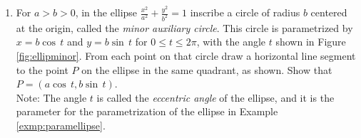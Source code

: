 \divider
\vspace{2mm}
\startexercises\label{sec7dot6}
{\small
{}
\begin{enumerate}[\bfseries 1.]
 \item\label{exer:ellipminor} For $a>b>0$, in the ellipse
  $\frac{x^2}{a^2}+\frac{y^2}{b^2}=1$ inscribe a circle of radius $b$ centered
  at the origin, called the \emph{minor auxiliary circle}. This circle is
  parametrized by $x=b \cos\,t$ and $y=b \sin\,t$ for $0 \le t \le 2\pi$, with
  the angle $t$ shown in Figure \ref{fig:ellipminor}. From each point on that
  circle draw a horizontal line segment to the point $P$ on the ellipse in the
  same quadrant, as shown. Show that $P=(a \cos\,t,b \sin\,t)$.\\Note: The
  angle $t$ is called the \emph{eccentric angle} of the ellipse, and it is the
  parameter for the parametrization of the
  ellipse in Example
  \ref{exmp:paramellipse}.\vspace{-4mm}


\end{enumerate}}
